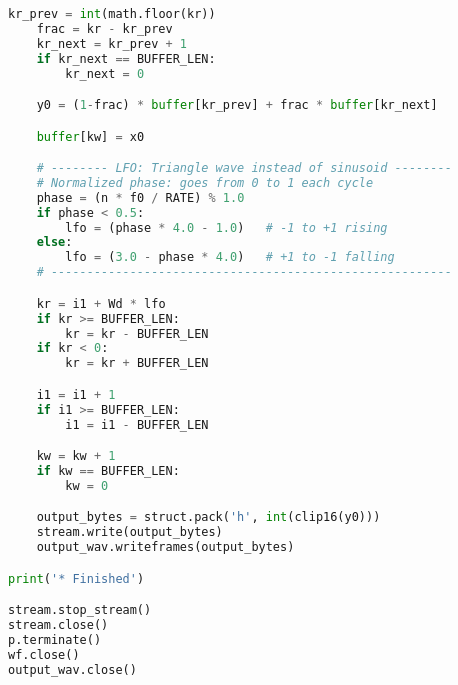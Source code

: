 \documentclass[11pt]{article}
\begin{document}
\begin{lstlisting}[language=python, caption={Full code}]
    kr_prev = int(math.floor(kr))
    frac = kr - kr_prev
    kr_next = kr_prev + 1
    if kr_next == BUFFER_LEN:
        kr_next = 0

    y0 = (1-frac) * buffer[kr_prev] + frac * buffer[kr_next]

    buffer[kw] = x0

    # -------- LFO: Triangle wave instead of sinusoid --------
    # Normalized phase: goes from 0 to 1 each cycle
    phase = (n * f0 / RATE) % 1.0
    if phase < 0.5:
        lfo = (phase * 4.0 - 1.0)   # -1 to +1 rising
    else:
        lfo = (3.0 - phase * 4.0)   # +1 to -1 falling
    # --------------------------------------------------------

    kr = i1 + Wd * lfo
    if kr >= BUFFER_LEN:
        kr = kr - BUFFER_LEN
    if kr < 0:
        kr = kr + BUFFER_LEN

    i1 = i1 + 1
    if i1 >= BUFFER_LEN:
        i1 = i1 - BUFFER_LEN

    kw = kw + 1
    if kw == BUFFER_LEN:
        kw = 0

    output_bytes = struct.pack('h', int(clip16(y0)))
    stream.write(output_bytes)
    output_wav.writeframes(output_bytes)

print('* Finished')

stream.stop_stream()
stream.close()
p.terminate()
wf.close()
output_wav.close()
\end{lstlisting}
\end{document}
